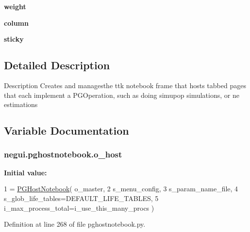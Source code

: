\begin{DoxyCompactItemize}
\item 
{\bfseries weight}\hypertarget{namespacenegui_1_1pghostnotebook_ad128d121aeac1b79c3f0f86d1fd8131c}{}\label{namespacenegui_1_1pghostnotebook_ad128d121aeac1b79c3f0f86d1fd8131c}

\item 
{\bfseries column}\hypertarget{namespacenegui_1_1pghostnotebook_a6c203ea581355857a12fad081c23c08a}{}\label{namespacenegui_1_1pghostnotebook_a6c203ea581355857a12fad081c23c08a}

\item 
{\bfseries sticky}\hypertarget{namespacenegui_1_1pghostnotebook_a5b7b1e279a09dd3ad592ac50862c7886}{}\label{namespacenegui_1_1pghostnotebook_a5b7b1e279a09dd3ad592ac50862c7886}

\end{DoxyCompactItemize}


\subsection{Detailed Description}
\begin{DoxyVerb}Description
Creates and managesthe ttk notebook frame
that hosts tabbed pages that each implement 
a PGOperation, such as doing simupop simulations,
or ne estimations
\end{DoxyVerb}
 

\subsection{Variable Documentation}
\subsubsection[{\texorpdfstring{o\+\_\+host}{o_host}}]{\setlength{\rightskip}{0pt plus 5cm}negui.\+pghostnotebook.\+o\+\_\+host}\hypertarget{namespacenegui_1_1pghostnotebook_a90452a51dfebcdcd89ed5eccb9094fe7}{}\label{namespacenegui_1_1pghostnotebook_a90452a51dfebcdcd89ed5eccb9094fe7}
{\bfseries Initial value\+:}
\begin{DoxyCode}
1 = \hyperlink{classnegui_1_1pghostnotebook_1_1PGHostNotebook}{PGHostNotebook}( o\_master, 
2             s\_menu\_config, 
3             s\_param\_name\_file, 
4             s\_glob\_life\_tables=DEFAULT\_LIFE\_TABLES,
5             i\_max\_process\_total=i\_use\_this\_many\_procs )
\end{DoxyCode}


Definition at line 268 of file pghostnotebook.\+py.

